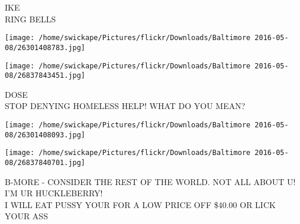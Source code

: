 \documentclass[10pt,letterpaper]{article}
\begin{document}
IKE\\
RING BELLS
\pagebreak

\texttt{[image: /home/swickape/Pictures/flickr/Downloads/Baltimore 2016-05-08/26301408783.jpg]}

\vspace{0.25in}
\texttt{[image: /home/swickape/Pictures/flickr/Downloads/Baltimore 2016-05-08/26837843451.jpg]}

DOSE\\
STOP DENYING HOMELESS HELP!  WHAT DO YOU MEAN?
\pagebreak

\texttt{[image: /home/swickape/Pictures/flickr/Downloads/Baltimore 2016-05-08/26301408093.jpg]}

\vspace{0.25in}
\texttt{[image: /home/swickape/Pictures/flickr/Downloads/Baltimore 2016-05-08/26837840701.jpg]}

B{-}MORE {-} CONSIDER THE REST OF THE WORLD.  NOT ALL ABOUT U!  I'M UR HUCKLEBERRY!\\
I WILL EAT PUSSY YOUR FOR A LOW PRICE OFF \$40.00 OR LICK YOUR ASS
\pagebreak
\end{document}
